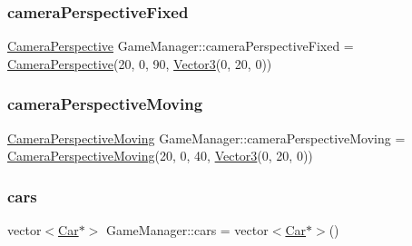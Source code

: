 \mbox{\label{class_game_manager_a06fd04f0626f7ff640804e4506fa6015}} 
\subsubsection{\texorpdfstring{camera\+Perspective\+Fixed}{cameraPerspectiveFixed}}
{\footnotesize\ttfamily \hyperlink{class_camera_perspective}{Camera\+Perspective} Game\+Manager\+::camera\+Perspective\+Fixed = \hyperlink{class_camera_perspective}{Camera\+Perspective}(20, 0, 90, \hyperlink{class_vector3}{Vector3}(0, 20, 0))}

\mbox{\label{class_game_manager_acc870ff353939b5b7970e85d536b10c7}} 
\subsubsection{\texorpdfstring{camera\+Perspective\+Moving}{cameraPerspectiveMoving}}
{\footnotesize\ttfamily \hyperlink{class_camera_perspective_moving}{Camera\+Perspective\+Moving} Game\+Manager\+::camera\+Perspective\+Moving = \hyperlink{class_camera_perspective_moving}{Camera\+Perspective\+Moving}(20, 0, 40, \hyperlink{class_vector3}{Vector3}(0, 20, 0))}

\mbox{\label{class_game_manager_af6d97ab7a3c0df3c4999aa60c7dcc083}} 
\subsubsection{\texorpdfstring{cars}{cars}}
{\footnotesize\ttfamily vector$<$\hyperlink{class_car}{Car}$\ast$$>$ Game\+Manager\+::cars = vector$<$\hyperlink{class_car}{Car}$\ast$$>$()}

\mbox{\label{class_game_manager_a9384497e205b12a342442aae07d729b5}} 
